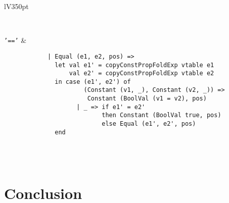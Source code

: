 \documentclass[a4paper]{article}
\newcommand{\command}[1]{\texttt{\string#1}}
\begin{document}
\begin{center}
\begin{tabular}{lV{350pt}}
\begin{verbatim}
		\end{verbatim}
		\\
		\command{'=='} &
		\begin{verbatim}
			| Equal (e1, e2, pos) =>
			  let val e1' = copyConstPropFoldExp vtable e1
			      val e2' = copyConstPropFoldExp vtable e2
			  in case (e1', e2') of
			          (Constant (v1, _), Constant (v2, _)) =>
			           Constant (BoolVal (v1 = v2), pos)
			        | _ => if e1' = e2'
			               then Constant (BoolVal true, pos)
			               else Equal (e1', e2', pos)
			  end
		\end{verbatim}
		\\ 
		\bottomrule \\
	\end{tabular}
\end{center}

\section{Conclusion}
\end{document}
